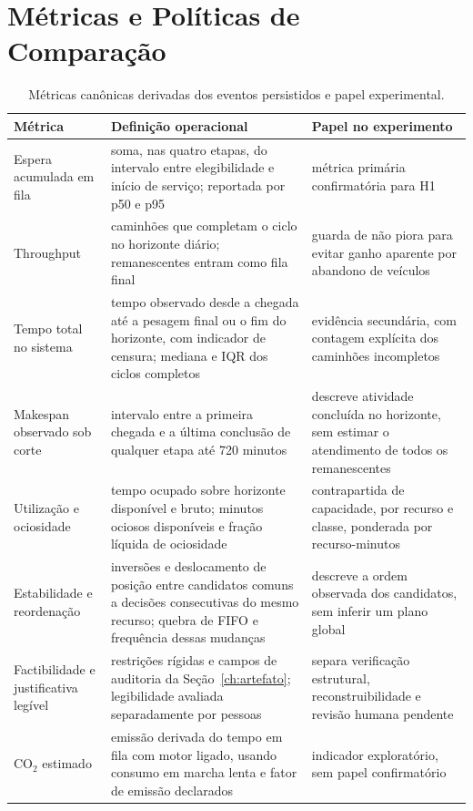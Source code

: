 \documentclass[
  12pt,
  oneside,
  a4paper,
  sumario=tradicional,
  brazil
]{abntex2}
\begin{document}
\section{Métricas e Políticas de Comparação}\label{ch:avaliacao}
\begin{table}[H]
\centering
\small
\setlength{\tabcolsep}{5pt}
\renewcommand{\arraystretch}{1.18}
\begin{tabularx}{\textwidth}{@{}P{0.24\textwidth}P{0.33\textwidth}Y@{}}
\toprule
{}
\textbf{M\'etrica} & \textbf{Defini\c{c}\~ao operacional} & \textbf{Papel no experimento} \\
\midrule
Espera acumulada em fila & soma, nas quatro etapas, do intervalo entre elegibilidade e in\'icio de servi\c{c}o; reportada por p50 e p95 & m\'etrica prim\'aria confirmat\'oria para H1 \\
\addlinespace
Throughput & caminh\~oes que completam o ciclo no horizonte di\'ario; remanescentes entram como fila final & guarda de n\~ao piora para evitar ganho aparente por abandono de ve\'iculos \\
\addlinespace
Tempo total no sistema & tempo observado desde a chegada at\'e a pesagem final ou o fim do horizonte, com indicador de censura; mediana e IQR dos ciclos completos & evid\^encia secund\'aria, com contagem expl\'icita dos caminh\~oes incompletos \\
\addlinespace
Makespan observado sob corte & intervalo entre a primeira chegada e a \'ultima conclus\~ao de qualquer etapa at\'e 720 minutos & descreve atividade conclu\'ida no horizonte, sem estimar o atendimento de todos os remanescentes \\
\addlinespace
Utiliza\c{c}\~ao e ociosidade & tempo ocupado sobre horizonte dispon\'ivel e bruto; minutos ociosos dispon\'iveis e fra\c{c}\~ao l\'iquida de ociosidade & contrapartida de capacidade, por recurso e classe, ponderada por recurso-minutos \\
\addlinespace
Estabilidade e reordena\c{c}\~ao & invers\~oes e deslocamento de posi\c{c}\~ao entre candidatos comuns a decis\~oes consecutivas do mesmo recurso; quebra de FIFO e frequ\^encia dessas mudan\c{c}as & descreve a ordem observada dos candidatos, sem inferir um plano global \\
\addlinespace
Factibilidade e justificativa leg\'ivel & restri\c{c}\~oes r\'igidas e campos de auditoria da Se\c{c}\~ao~\ref{ch:artefato}; legibilidade avaliada separadamente por pessoas & separa verifica\c{c}\~ao estrutural, reconstruibilidade e revis\~ao humana pendente \\
\addlinespace
$\mathrm{CO_2}$ estimado & emiss\~ao derivada do tempo em fila com motor ligado, usando consumo em marcha lenta e fator de emiss\~ao declarados & indicador explorat\'orio, sem papel confirmat\'orio \\
\bottomrule
\end{tabularx}
\caption[M\'etricas dos eventos persistidos]{M\'etricas can\^onicas derivadas dos eventos persistidos e papel experimental.}
\label{tab:metricas-consolidadas}
\end{table}
\end{document}
